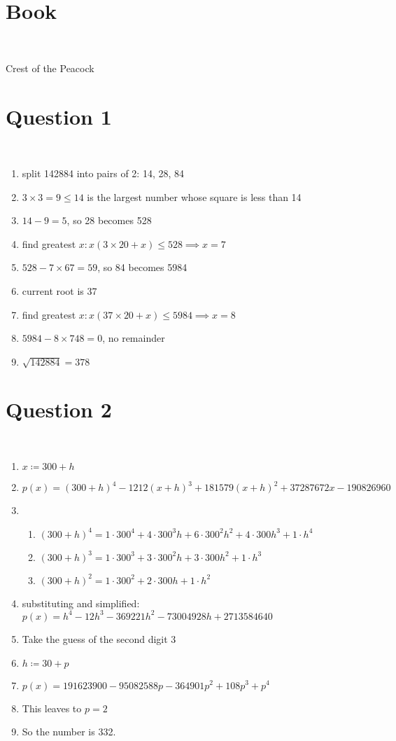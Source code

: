 \documentclass{article}
\begin{document}
\section*{Book}

~

Crest of the Peacock
\newpage

\section*{Question 1}

~

\begin{enumerate}
    \item split 142884 into pairs of 2: 14, 28, 84
    \item $3\times3=9\leq14$ is the largest number whose square is less than 14
    \item $14-9=5$, so 28 becomes 528
    \item find greatest $x :x(3\times 20+x)\leq 528\implies x=7$
    \item $528-7\times 67=59$, so 84 becomes 5984
    \item current root is 37
    \item find greatest $x :x(37\times 20+x)\leq 5984\implies x=8$
    \item $5984-8\times 748=0$, no remainder
    \item $\sqrt{142884}=378$
\end{enumerate}

\newpage

\section*{Question 2}

~

\begin{enumerate}
    \item $x\coloneqq 300+h$
    \item $p(x)=(300+h)^4-1212(x+h)^3+181579(x+h)^2+37287672x-190826960$
    \item \begin{enumerate}
        \item $(300+h)^4=1\cdot300^4+4\cdot 300^3h+6\cdot 300^2h^2+4\cdot300h^3+1\cdot h^4$
        \item $(300+h)^3=1\cdot300^3+3\cdot 300^2h+3\cdot 300h^2+1\cdot h^3$
        \item $(300+h)^2=1\cdot300^2+2\cdot300h+1\cdot h^2$
        \end{enumerate}
    \item substituting and simplified: $p(x)=h^4-12h^3-369221h^2-73004928h+2713584640$
    \item Take the guess of the second digit 3
    \item $h\coloneqq 30+p$
    \item $p(x)=191623900 - 95082588 p - 364901 p^2 + 108 p^3 + p^4$
    \item This leaves to $p=2$
    \item So the number is 332.
\end{enumerate}
\end{document}
